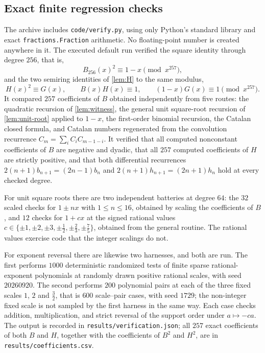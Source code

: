 \documentclass[11pt,letterpaper]{article}
\theoremstyle{definition}
\theoremstyle{remark}
\begin{document}
\subsection{Exact finite regression checks}
The archive includes \texttt{code/verify.py}, using only Python's standard
library and exact \texttt{fractions.Fraction} arithmetic. No floating-point
number is created anywhere in it. The executed default run verified the square
identity through degree $256$, that is,
\[
 B_{256}(x)^2\equiv1-x\pmod{x^{257}},
\]
and the two semiring identities of \cref{lem:H} to the same modulus,
\[
 H(x)^2\equiv G(x),\qquad B(x)H(x)\equiv1,\qquad (1-x)G(x)\equiv1
 \pmod{x^{257}}.
\]
It compared $257$ coefficients of $B$ obtained independently from five routes:
the quadratic recursion of \cref{lem:witness}, the general unit square-root
recursion of \cref{lem:unit-root} applied to $1-x$, the first-order binomial
recursion, the Catalan closed formula, and Catalan numbers regenerated from
the convolution recurrence $C_m=\sum_iC_iC_{m-1-i}$. It verified that all
computed nonconstant coefficients of $B$ are negative and dyadic, that all
$257$ computed coefficients of $H$ are strictly positive, and that both
differential recurrences $2(n+1)b_{n+1}=(2n-1)b_n$ and
$2(n+1)h_{n+1}=(2n+1)h_n$ hold at every checked degree.

For unit square roots there are two independent batteries at degree $64$: the
$32$ scaled checks for $1\pm nx$ with $1\le n\le16$, obtained by scaling the
coefficients of $B$, and $12$ checks for $1+cx$ at the signed rational values
$c\in\{\pm1,\pm2,\pm3,\pm\tfrac12,\pm\tfrac23,\pm\tfrac75\}$, obtained from
the general routine. The rational values exercise code that the integer
scalings do not.

For exponent reversal there are likewise two harnesses, and both are run.
The first performs $1000$ deterministic randomized tests of finite sparse
rational-exponent polynomials at randomly drawn positive rational scales, with
seed $20260920$. The second performs $200$ polynomial pairs at each of the
three fixed scales $1$, $2$ and $\tfrac32$, that is $600$ scale--pair cases,
with seed $1729$; the non-integer fixed scale is not sampled by the first
harness in the same way. Each case checks addition, multiplication, and strict
reversal of the support order under $a\mapsto-ca$. The output is recorded in
\texttt{results/verification.json}; all $257$ exact coefficients of both $B$
and $H$, together with the coefficients of $B^2$ and $H^2$, are in
\texttt{results/coefficients.csv}.
\end{document}
